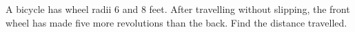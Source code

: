A bicycle has wheel radii 6 and 8 feet. After travelling without slipping, the front wheel has made five more revolutions than the back. Find the distance travelled.
